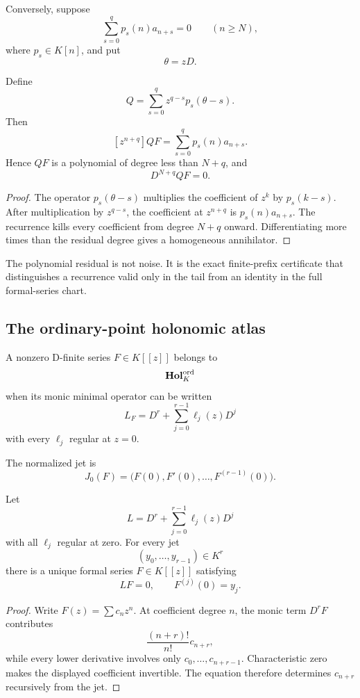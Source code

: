 Conversely, suppose
\[
 \sum_{s=0}^{q}p_s(n)a_{n+s}=0
 \qquad(n\geq N),
\]
where $p_s\in K[n]$, and put
\[
 \theta=zD.
\]

\begin{theorem}
\label{thm:block09-rec-to-diff}
Define
\[
 \boxed{
 Q
 =
 \sum_{s=0}^{q}
 z^{q-s}p_s(\theta-s).}
\]
Then
\[
 \boxed{
 [z^{n+q}]QF
 =
 \sum_{s=0}^{q}p_s(n)a_{n+s}.}
\]
Hence $QF$ is a polynomial of degree less than $N+q$, and
\[
 \boxed{D^{N+q}QF=0.}
\]
\end{theorem}

\begin{proof}
The operator $p_s(\theta-s)$ multiplies the coefficient of $z^k$ by $p_s(k-s)$.  After multiplication by $z^{q-s}$, the coefficient at $z^{n+q}$ is $p_s(n)a_{n+s}$.  The recurrence kills every coefficient from degree $N+q$ onward.  Differentiating more times than the residual degree gives a homogeneous annihilator.
\end{proof}

The polynomial residual is not noise.  It is the exact finite-prefix certificate that distinguishes a recurrence valid only in the tail from an identity in the full formal-series chart.

\subsection{The ordinary-point holonomic atlas}
\label{subsec:block09-ordinary-atlas}

\begin{definition}
A nonzero D-finite series $F\in K[[z]]$ belongs to
\[
 \mathbf{Hol}^{\rm ord}_K
\]
when its monic minimal operator can be written
\[
 L_F
 =
 D^r+\sum_{j=0}^{r-1}\ell_j(z)D^j
\]
with every $\ell_j$ regular at $z=0$.
\end{definition}

The normalized jet is
\[
 J_0(F)
 =
 \bigl(F(0),F'(0),\ldots,F^{(r-1)}(0)\bigr).
\]

\begin{theorem}
\label{thm:block09-ordinary-reconstruction}
Let
\[
 L=D^r+\sum_{j=0}^{r-1}\ell_j(z)D^j
\]
with all $\ell_j$ regular at zero.  For every jet
\[
 (y_0,\ldots,y_{r-1})\in K^r
\]
there is a unique formal series $F\in K[[z]]$ satisfying
\[
 LF=0,
 \qquad
 F^{(j)}(0)=y_j.
\]
\end{theorem}

\begin{proof}
Write $F(z)=\sum c_nz^n$.  At coefficient degree $n$, the monic term $D^rF$ contributes
\[
 \frac{(n+r)!}{n!}c_{n+r},
\]
while every lower derivative involves only $c_0,\ldots,c_{n+r-1}$.  Characteristic zero makes the displayed coefficient invertible.  The equation therefore determines $c_{n+r}$ recursively from the jet.
\end{proof}

